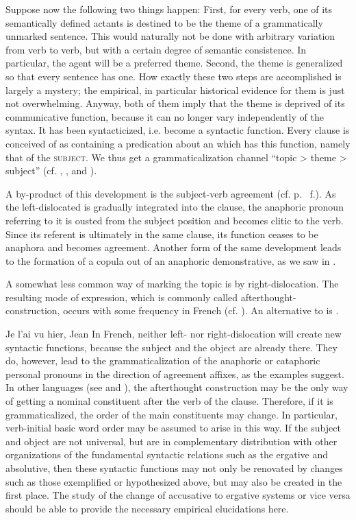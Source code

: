 Suppose now the following two things happen: First, for every verb, one of its semantically defined actants is destined to be the theme of a grammatically unmarked sentence. This would naturally not be done with arbitrary variation from verb to verb, but with a certain degree of semantic consistence. In particular, the agent will be a preferred theme. Second, the theme is generalized so that every sentence has one. How exactly these two steps are accomplished is largely a mystery; the empirical, in particular historical evidence for them is just not overwhelming. Anyway, both of them imply that the theme is deprived of its communicative function, because it can no longer vary independently of the syntax. It has been syntacticized, i.e. become a syntactic function. Every clause is conceived of as containing a predication about an \np which has this function, namely that of the \textsc{subject}. We thus get a grammaticalization channel ``topic {\textgreater} theme {\textgreater} subject'' (cf. \citealt[484]{LiEtAl1976}, \citealt[83--85]{Givón1979}, \citealt[114]{Comrie1981b} and \citealt[99--101]{MallinsonEtAl1981}).

A by-product of this development is the subject-verb agreement (cf. p.~\pageref{page44}\chk%
f.). As the left-dislocated \np is gradually integrated into the clause, the anaphoric pronoun referring to it is ousted from the subject position and becomes clitic to the verb. Since its referent is ultimately in the same clause, its function ceases to be anaphora and becomes agreement. Another form of the same development leads to the formation of a copula out of an anaphoric demonstrative, as we saw in .

A somewhat less common way of marking the topic is by right-dislocation. The resulting mode of expression, which is commonly called afterthought-\linebreak construction, occurs with some frequency in French (cf. \citealt[402, 427]{MallinsonEtAl1981}). An alternative to  is .

\ea \label{ex:E94}
  Je l'ai vu hier, Jean
  \z
\noindent In French, neither left- nor right-dislocation will create new syntactic functions, because the subject and the object are already there. They do, however, lead to the grammaticalization of the anaphoric or cataphoric personal pronouns in the direction of agreement affixes, as the examples suggest. In other languages (see \citealt[119--121]{Hyman1975} and \citealt[170]{Vincent1980a}), the afterthought construction may be the only way of getting a nominal constituent after the verb of the clause. Therefore, if it is grammaticalized, the order of the main constituents may change. In particular, verb-initial basic word order may be assumed to arise in this way. If the subject and object are not universal, but are in complementary distribution with other organizations of the fundamental syntactic relations such as the ergative and absolutive, then these syntactic functions may not only be renovated by changes such as those exemplified or hypothesized above, but may also be created in the first place. The study of the change of accusative to ergative systems or vice versa should be able to provide the necessary empirical elucidations here.

